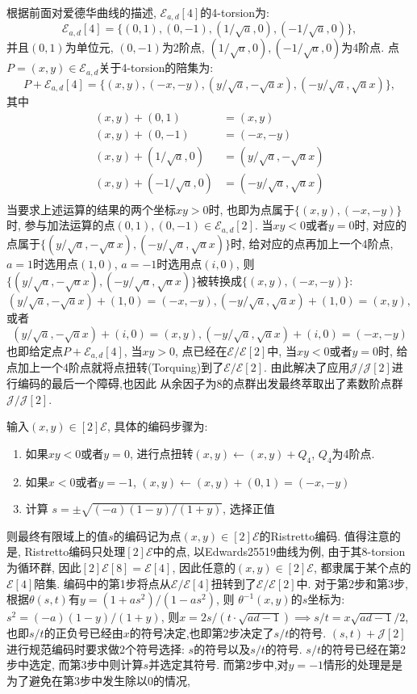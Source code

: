 \documentclass{article}
\newcommand{\E}{\mathcal{E}}
\newcommand{\J}{\mathcal{J}}
\begin{document}
根据前面对爱德华曲线的描述, $\E_{a,d}[4]$的4-torsion为:
$$
\E_{a,d}[4] = \{(0,1), (0,-1), (1/\sqrt{a}, 0), (-1/\sqrt{a}, 0)\},
$$
并且$(0,1)$为单位元, $(0,-1)$为2阶点, $(1/\sqrt{a}, 0), (-1/\sqrt{a}, 0)$为4阶点.
点$P = (x,y) \in \E_{a,d}$关于4-torsion的陪集为:
$$
P + \E_{a,d}[4] = \{ (x,y), (-x,-y), (y/\sqrt{a}, -\sqrt{a}x), (-y/\sqrt{a}, \sqrt{a}x) \},
$$
其中
$$
\begin{array}{rl}
(x,y) + (0, 1) & = (x,y) \\
(x,y) + (0, -1) &= (-x, -y) \\
(x, y) + (1/\sqrt{a}, 0) &=   (y/\sqrt{a}, -\sqrt{a}x)\\
(x,y) + (-1/\sqrt{a}, 0) &=  (-y/\sqrt{a}, \sqrt{a}x)\\
\end{array}
$$
当要求上述运算的结果的两个坐标$xy > 0$时, 也即为点属于$\{(x,y), (-x, -y)\}$时,
参与加法运算的点$(0,1), (0,-1) \in \E_{a,d}[2]$.
当$xy < 0$或者$y = 0$时, 对应的点属于$\{(y/\sqrt{a}, -\sqrt{a}x), (-y/\sqrt{a}, \sqrt{a}x)\}$时,
给对应的点再加上一个4阶点, $a = 1$时选用点$(1,0)$, $a = -1$时选用点$(i, 0)$,
则$\{(y/\sqrt{a}, -\sqrt{a}x), (-y/\sqrt{a}, \sqrt{a}x)\}$被转换成$\{(x,y), (-x, -y)\}$:
$$
(y/\sqrt{a}, -\sqrt{a}x) + (1,0) = (-x, -y),  (-y/\sqrt{a}, \sqrt{a}x) + (1,0) = (x,y),
$$
或者
$$
(y/\sqrt{a}, -\sqrt{a}x) + (i,0) = (x, y),  (-y/\sqrt{a}, \sqrt{a}x) + (i,0) = (-x,-y)
$$
也即给定点$P + \E_{a,d}[4]$, 当$xy > 0$, 点已经在$\E/\E[2]$中, 
当$xy < 0$或者$y=0$时, 给点加上一个4阶点就将点扭转(Torquing)到了$\E/\E[2]$.
由此解决了应用$\J/\J[2]$进行编码的最后一个障碍,也因此
从余因子为8的点群出发最终萃取出了素数阶点群$\J/\J[2]$.

输入$(x,y) \in [2]\E$, 具体的编码步骤为: 
\begin{enumerate}
\item 如果$xy < 0$或者$y = 0$, 进行点扭转$(x,y)\leftarrow (x,y) + Q_4$, $Q_4$为4阶点.
\item 如果$x < 0$或者$y=-1$, $(x,y) \leftarrow (x,y) + (0,1) = (-x, -y)$
\item 计算 $s = \pm\sqrt{(-a)(1-y)/(1+y)}$, 选择正值
\end{enumerate}
则最终有限域上的值$s$的编码记为点$(x,y) \in [2]\E$的Ristretto编码.
值得注意的是, Ristretto编码只处理$[2]\E$中的点, 以Edwards25519曲线为例,
由于其8-torsion为循环群, 因此$[2]\E[8] = \E[4]$, 因此任意的$(x,y) \in [2]\E$, 
都隶属于某个点的$\E[4]$陪集. 编码中的第1步将点从$\E/\E[4]$扭转到了$\E/\E[2]$中.
对于第2步和第3步, 根据$\theta(s,t)$有$y = (1 + as^2)/(1-as^2)$, 则
$\theta^{-1}(x,y)$的$s$坐标为: $s^2 = (-a)(1-y)/(1+y)$, 
则$x = 2s/(t\cdot\sqrt{ad-1}) \implies s/t = x\sqrt{ad-1}/2$,
也即$s/t$的正负号已经由$x$的符号决定,也即第2步决定了$s/t$的符号.
$(s,t) + \J[2]$进行规范编码时要求做2个符号选择: $s$的符号以及$s/t$的符号.
$s/t$的符号已经在第2步中选定, 而第3步中则计算$s$并选定其符号.
而第2步中,对$y=-1$情形的处理是是为了避免在第3步中发生除以0的情况,
\end{document}
